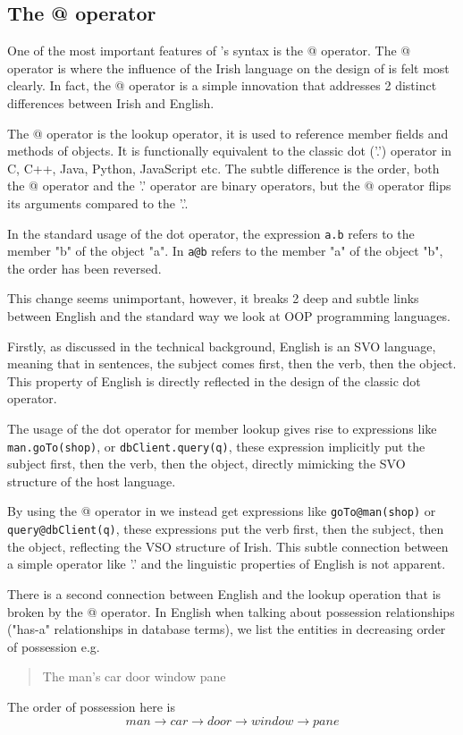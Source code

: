 \subsection{The @ operator}

One of the most important features of \Setanta{}'s syntax is the @ operator. The @ operator is where the influence of the Irish language on the design of \Setanta{} is felt most clearly. In fact, the @ operator is a simple innovation that addresses 2 distinct differences between Irish and English.

The @ operator is the lookup operator, it is used to reference member fields and methods of objects. It is functionally equivalent to the classic dot ('.') operator in C, C++, Java, Python, JavaScript etc. The subtle difference is the order, both the @ operator and the '.' operator are binary operators, but the @ operator flips its arguments compared to the '.'.

In the standard usage of the dot operator, the expression \verb|a.b| refers to the member "b" of the object "a". In \Setanta{} \verb|a@b| refers to the member "a" of the object "b", the order has been reversed.

This change seems unimportant, however, it breaks 2 deep and subtle links between English and the standard way we look at OOP programming languages.

Firstly, as discussed in the technical background, English is an SVO language, meaning that in sentences, the subject comes first, then the verb, then the object. This property of English is directly reflected in the design of the classic dot operator.

The usage of the dot operator for member lookup gives rise to expressions like \verb|man.goTo(shop)|, or \verb|dbClient.query(q)|, these expression implicitly put the subject first, then the verb, then the object, directly mimicking the SVO structure of the host language.

By using the @ operator in \Setanta{} we instead get expressions like \verb|goTo@man(shop)| or \verb|query@dbClient(q)|, these expressions put the verb first, then the subject, then the object, reflecting the VSO structure of Irish. This subtle connection between a simple operator like '.' and the linguistic properties of English is not apparent.

There is a second connection between English and the lookup operation that is broken by the @ operator. In English when talking about possession relationships ("has-a" relationships in database terms), we list the entities in decreasing order of possession e.g.
\begin{quote}
    The man's car door window pane
\end{quote}
The order of possession here is
\[man \rightarrow car \rightarrow door \rightarrow window \rightarrow pane\]

